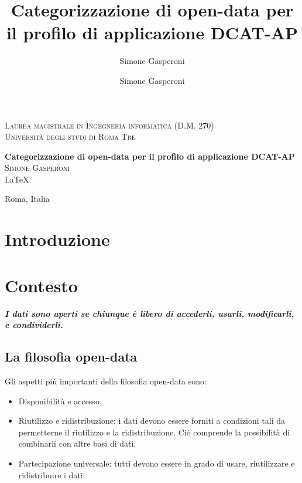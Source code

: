\documentclass{article}
\author{Simone Gasperoni}
\author{Simone Gasperoni}
\title{Categorizzazione di open-data per il profilo di applicazione DCAT-AP}
\theoremstyle{plain}
\theoremstyle{definition}
\begin{document}
\begin{titlepage}
\begin{center}

\textsc{Laurea magistrale in Ingegneria informatica (D.M. 270)}\\[0.5cm]
\textsc{Università degli studi di Roma Tre}\\[0.5cm]

\hrulefill

{ \huge \bfseries Categorizzazione di open-data per il profilo di applicazione DCAT-AP \\[0.4cm] }
\textsc{\Large Simone Gasperoni}\\[0.5cm]
\vfill
\LaTeX


Roma, Italia
\end{center}
\end{titlepage}


\tableofcontents

\newpage
\section{Introduzione}

\newpage
\section{Contesto}
\textbf{\textit{I dati sono aperti se chiunque è libero di accederli, usarli, modificarli, e condividerli.}}
\footnotemark
{}

\subsection{La filosofia open-data}

Gli aspetti più importanti della filosofia open-data sono:
\begin{itemize}
\item Disponibilità e accesso.
\item Riutilizzo e ridistribuzione: i dati devono essere forniti a condizioni tali da permetterne il riutilizzo e la ridistribuzione. Ciò comprende la possibilità di combinarli con altre basi di dati.
\item Partecipazione universale: tutti devono essere in grado di usare, riutilizzare e ridistribuire i dati.
\end{itemize}
\end{document}
